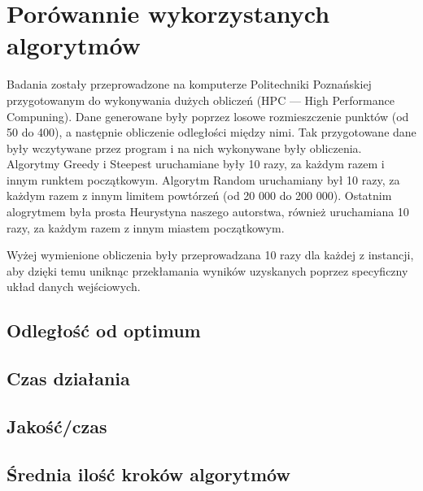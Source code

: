 \section{Porówannie wykorzystanych algorytmów}

Badania zostały przeprowadzone na komputerze Politechniki Poznańskiej przygotowanym do 
wykonywania dużych obliczeń (HPC --- High Performance Compuning). Dane generowane były 
poprzez losowe rozmieszczenie punktów (od 50 do 400), a następnie obliczenie odległości 
między nimi. Tak przygotowane dane były wczytywane przez program i na nich wykonywane były 
obliczenia. Algorytmy Greedy i Steepest uruchamiane były 10 razy, za każdym razem i innym 
runktem początkowym. Algorytm Random uruchamiany był 10 razy, za każdym razem z innym 
limitem powtórzeń (od 20 000 do 200 000). Ostatnim alogrytmem była prosta Heurystyna naszego
autorstwa, również uruchamiana 10 razy, za każdym razem z innym miastem początkowym.

Wyżej wymienione obliczenia były przeprowadzana 10 razy dla każdej z instancji, aby dzięki temu 
uniknąc przekłamania wyników uzyskanych poprzez specyficzny układ danych wejściowych.

\subsection{Odległość od optimum}

\subsection{Czas działania}

\subsection{Jakość/czas}

\subsection{Średnia ilość kroków algorytmów}